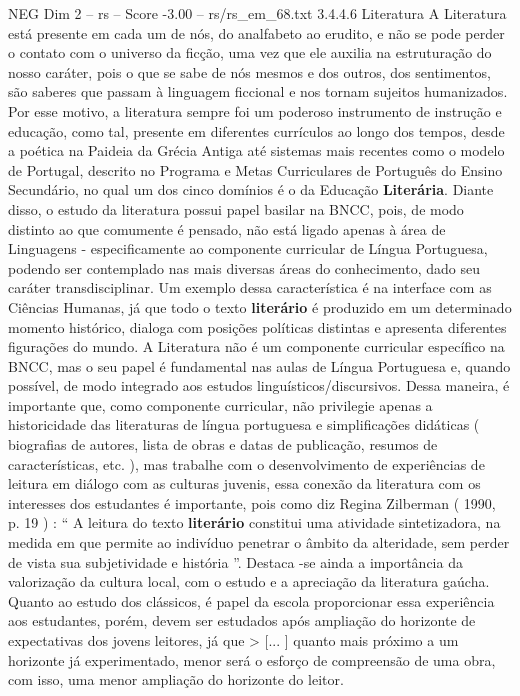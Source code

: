 \begin{textsample}{NEG Dim 2 – rs – Score -3.00 – rs/rs\_em\_68.txt}  \label{ex:f2_neg_212}
3.4.4.6 Literatura A Literatura está presente em cada um de nós, do analfabeto ao erudito, e não se pode perder o contato com o universo da ficção, uma vez que ele auxilia na estruturação do nosso caráter, pois o que se sabe de nós mesmos e dos outros, dos sentimentos, são saberes que passam à linguagem ficcional e nos tornam sujeitos humanizados.
Por esse motivo, a literatura sempre foi um poderoso instrumento de instrução e educação, como tal, presente em diferentes currículos ao longo dos tempos, desde a poética na Paideia da Grécia Antiga até sistemas mais recentes como o modelo de Portugal, descrito no Programa e Metas Curriculares de Português do Ensino Secundário, no qual um dos cinco domínios é o da Educação \textbf{Literária}.
Diante disso, o estudo da literatura possui papel basilar na BNCC, pois, de modo distinto ao que comumente é pensado, não está ligado apenas à área de Linguagens - especificamente ao componente curricular de Língua Portuguesa, podendo ser contemplado nas mais diversas áreas do conhecimento, dado seu caráter transdisciplinar.
Um exemplo dessa característica é na interface com as Ciências Humanas, já que todo o texto \textbf{literário} é produzido em um determinado momento histórico, dialoga com posições políticas distintas e apresenta diferentes figurações do mundo.
A Literatura não é um componente curricular específico na BNCC, mas o seu papel é fundamental nas aulas de Língua Portuguesa e, quando possível, de modo integrado aos estudos linguísticos/discursivos.
Dessa maneira, é importante que, como componente curricular, não privilegie apenas a historicidade das literaturas de língua portuguesa e simplificações didáticas ( biografias de autores, lista de obras e datas de publicação, resumos de características, etc. ), mas trabalhe com o desenvolvimento de experiências de leitura em diálogo com as culturas juvenis, essa conexão da literatura com os interesses dos estudantes é importante, pois como diz Regina Zilberman ( 1990, p. 19 ) : “ A leitura do texto \textbf{literário} constitui uma atividade sintetizadora, na medida em que permite ao indivíduo penetrar o âmbito da alteridade, sem perder de vista sua subjetividade e história ”.
Destaca -se ainda a importância da valorização da cultura local, com o estudo e a apreciação da literatura gaúcha.
Quanto ao estudo dos clássicos, é papel da escola proporcionar essa experiência aos estudantes, porém, devem ser estudados após ampliação do horizonte de expectativas dos jovens leitores, já que > [... ] quanto mais próximo a um horizonte já experimentado, menor será o esforço de compreensão de uma obra, com isso, uma menor ampliação do horizonte do leitor.

\end{textsample}
